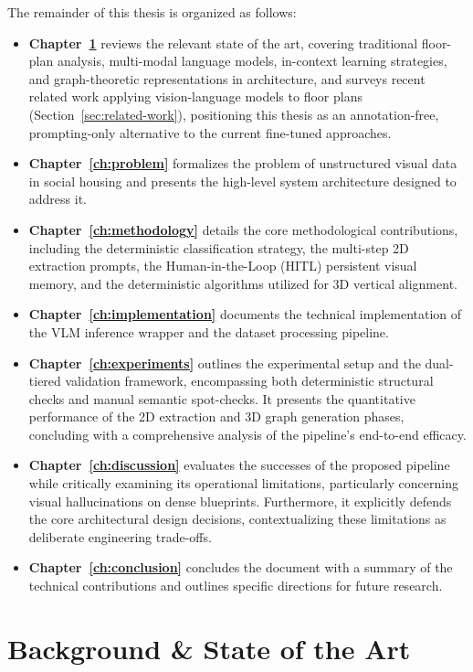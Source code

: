 \documentclass[12pt,a4paper,openright]{report}
\begin{document}
The remainder of this thesis is organized as follows:
\begin{itemize}
    \item \textbf{Chapter~\ref{ch:background}} reviews the relevant state of the art, covering traditional floor-plan analysis, multi-modal language models, in-context learning strategies, and graph-theoretic representations in architecture, and surveys recent related work applying vision-language models to floor plans (Section~\ref{sec:related-work}), positioning this thesis as an annotation-free, prompting-only alternative to the current fine-tuned approaches.
    \item \textbf{Chapter~\ref{ch:problem}} formalizes the problem of unstructured visual data in social housing and presents the high-level system architecture designed to address it.
    \item \textbf{Chapter~\ref{ch:methodology}} details the core methodological contributions, including the deterministic classification strategy, the multi-step 2D extraction prompts, the Human-in-the-Loop (HITL) persistent visual memory, and the deterministic algorithms utilized for 3D vertical alignment.
    \item \textbf{Chapter~\ref{ch:implementation}} documents the technical implementation of the VLM inference wrapper and the dataset processing pipeline.
    \item \textbf{Chapter~\ref{ch:experiments}} outlines the experimental setup and the dual-tiered validation framework, encompassing both deterministic structural checks and manual semantic spot-checks. It presents the quantitative performance of the 2D extraction and 3D graph generation phases, concluding with a comprehensive analysis of the pipeline's end-to-end efficacy.
    \item \textbf{Chapter~\ref{ch:discussion}} evaluates the successes of the proposed pipeline while critically examining its operational limitations, particularly concerning visual hallucinations on dense blueprints. Furthermore, it explicitly defends the core architectural design decisions, contextualizing these limitations as deliberate engineering trade-offs.
    \item \textbf{Chapter~\ref{ch:conclusion}} concludes the document with a summary of the technical contributions and outlines specific directions for future research.
\end{itemize}

\chapter{Background \& State of the Art}
\label{ch:background}
\end{document}
